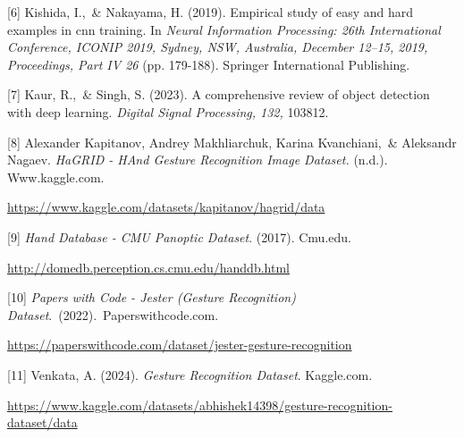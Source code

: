 \documentclass{article}
\begin{document}
[6] Kishida, I.,\ \& Nakayama, H. (2019). Empirical study of easy and hard examples in cnn training. In {\it Neural Information Processing: 26th International Conference, ICONIP 2019, Sydney, NSW, Australia, December 12–15, 2019, Proceedings, Part IV 26 }(pp. 179-188). Springer International Publishing.

[7] Kaur, R.,\ \& Singh, S. (2023). A comprehensive review of object detection with deep learning. {\it Digital Signal Processing, 132,} 103812. 

[8] Alexander Kapitanov, Andrey Makhliarchuk, Karina Kvanchiani,\ \& Aleksandr Nagaev. {\it HaGRID - HAnd Gesture Recognition Image Dataset.} (n.d.). Www.kaggle.com. \begin{center}\url{https://www.kaggle.com/datasets/kapitanov/hagrid/data}\end{center}

[9] {\it Hand Database - CMU Panoptic Dataset}. (2017). Cmu.edu. \begin{center}\url{http://domedb.perception.cs.cmu.edu/handdb.html}\end{center}

[10] {\it Papers with Code - Jester (Gesture Recognition) Dataset}.\ (2022).\ Paperswithcode.com. \begin{center}\url{https://paperswithcode.com/dataset/jester-gesture-recognition}\end{center}

[11] Venkata, A. (2024). {\it Gesture Recognition Dataset}. Kaggle.com. 
\begin{center}
    \url{https://www.kaggle.com/datasets/abhishek14398/gesture-recognition-dataset/data}
\end{center}
\end{document}
